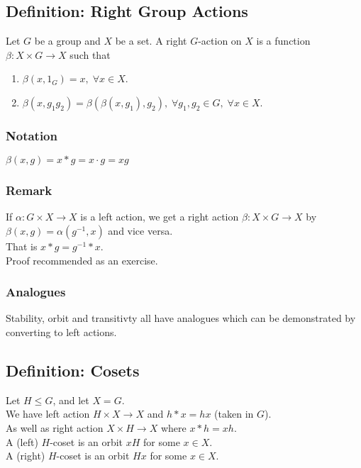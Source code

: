 \documentclass[11pt]{article}
\newcommand{\0}{\emptyset}
\begin{document}
\subsection*{Definition: Right Group Actions}
\label{sec:orgea97940}
Let \(G\) be a group and \(X\) be a set. A right \(G\)-action on \(X\) is a function \(\beta:X\times G\to X\) such that\\[0pt]
\begin{enumerate}
\item \(\beta(x,1_{G})=x,\;\forall x\in X\).\\[0pt]
\item \(\beta(x,g_{1}g_{2})=\beta(\beta(x,g_{1}),g_{2}),\;\forall g_{1},g_{2}\in G,\;\forall x\in X\).\\[0pt]
\end{enumerate}
\subsubsection*{Notation}
\label{sec:orgcbcd2ca}
\(\beta(x,g)=x*g=x\cdot g=xg\)\\[0pt]
\subsubsection*{Remark}
\label{sec:org6214c05}
If \(\alpha:G\times X\to X\) is a left action, we get a right action \(\beta:X\times G\to X\) by \(\beta(x,g)=\alpha(g^{-1},x)\) and vice versa.\\[0pt]
That is \(x*g=g^{-1}*x\).\\[0pt]
Proof recommended as an exercise.\\[0pt]
\subsubsection*{Analogues}
\label{sec:org3341fb4}
Stability, orbit and transitivty all have analogues which can be demonstrated by converting to left actions.\\[0pt]
\subsection*{Definition: Cosets}
\label{sec:org95438fb}
Let \(H\leq G\), and let \(X=G\).\\[0pt]
We have left action \(H\times X\to X\) and \(h*x=hx\) (taken in \(G\)).\\[0pt]
As well as right action \(X\times H\to X\) where \(x*h=xh\).\\[0pt]
A (left) \(H\)-coset is an orbit \(xH\) for some \(x\in X\).\\[0pt]
A (right) \(H\)-coset is an orbit \(Hx\) for some \(x\in X\).\\[0pt]
\end{document}
